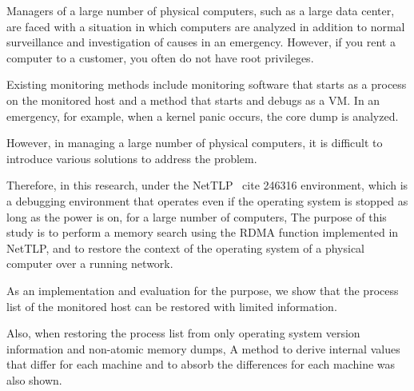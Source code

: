 \begin{eabstract}

Managers of a large number of physical computers, such as a large data center, are faced with a situation in which computers are analyzed in addition to normal surveillance and investigation of causes in an emergency.
However, if you rent a computer to a customer, you often do not have root privileges.

Existing monitoring methods include monitoring software that starts as a process on the monitored host and a method that starts and debugs as a VM.
In an emergency, for example, when a kernel panic occurs, the core dump is analyzed.

However, in managing a large number of physical computers, it is difficult to introduce various solutions to address the problem.

Therefore, in this research, under the NetTLP \ cite {246316} environment, which is a debugging environment that operates even if the operating system is stopped as long as the power is on, for a large number of computers,
The purpose of this study is to perform a memory search using the RDMA function implemented in NetTLP, and to restore the context of the operating system of a physical computer over a running network.

As an implementation and evaluation for the purpose, we show that the process list of the monitored host can be restored with limited information.

Also, when restoring the process list from only operating system version information and non-atomic memory dumps,
A method to derive internal values ​​that differ for each machine and to absorb the differences for each machine was also shown.

\end{eabstract}
